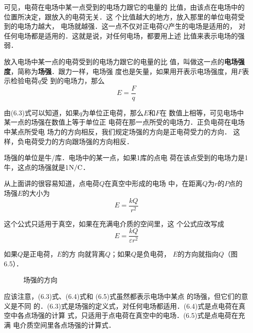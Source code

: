 可见，电荷在电场中某一点受到的电场力跟它的电量的
比值，由该点在电场中的位置所决定，跟放入的电荷无关．这
个比值越大的地方，放入那里的单位电荷受到的电场力越大，
电场就越强．这一点不仅对正电荷$Q$产生的电场是适用的，
对任何电场都是适用的．这就是说，对任何电场，都要用上述
比值来表示电场的强弱．

放入电场中某一点的电荷受到的电场力跟它的电量的比
值，叫做这一点的\textbf{电场强度}，简称为\textbf{场强}．跟力一样，电场强
度也是矢量，如果用开表示电场强度，用$F$表示检验电荷$q$受
到的电场力，那么
\begin{equation}
	E=\frac{F}{q}
\end{equation}

由(6.3)式可以知道，如果$q$为单位正电荷，那么$E$和$F$在
数值上相等，可见电场中某一点的场强在数值上等于单位正
电荷在那一点所受的电场力．正负电荷在电场中某点所受电
场力的方向相反，我们规定场强的方向是正电荷受力的方向．
这样，负电荷受力的方向跟场强的方向相反．

场强的单位是牛/库．电场中的某一点，如果1库的点电
荷在该点受到的电场力是1牛，这点的场强就是1${\rm N}/{\rm C}$．

从上面讲的很容易知道，点电荷$Q$在真空中形成的电场
中，在距离$Q$为$r$的$P$点的场强$E$的大小为
\begin{equation}
	E=\frac{kQ}{r^2}
\end{equation}

这个公式只适用于真空，如果在充满电介质的空间里，这
个公式应改写成
\begin{equation}
	E=\frac{kQ}{\varepsilon r^2}
\end{equation}

如果$Q$是正电荷，$E$的方
向就背离$Q$；如果$Q$是负电荷，
$E$的方向就指向$Q$（图6.5）．
\begin{figure}[htp]
	\centering
{}
\qquad 	{}
	\caption{场强的方向}
	\end{figure}

应该注意，(6.3)式、(6.4)式和
(6.5)式虽然都表示电场中某点
的场强，但它们的意义是不同
的．(6.3)式是场强的定义式，对任何电场都适用．(6.4)式是点电荷在真空中各点场强的计算
式，只适用于点电荷在真空中的电场．(6.5)式是点电荷在充满
电介质空间里各点场强的计算式．

